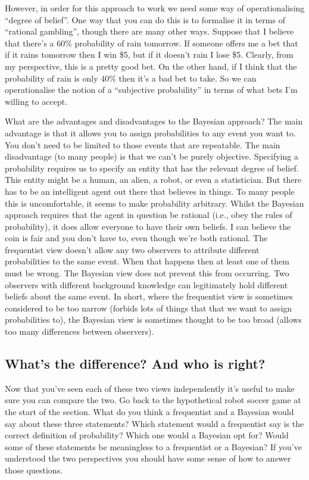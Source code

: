 \documentclass[
  a4paper,
]{book}
\begin{document}
However, in order for this approach to work we need some way of
operationalising ``degree of belief''. One way that you can do this is
to formalise it in terms of ``rational gambling'', though there are many
other ways. Suppose that I believe that there's a 60\% probability of
rain tomorrow. If someone offers me a bet that if it rains tomorrow then
I win \$5, but if it doesn't rain I lose \$5. Clearly, from my
perspective, this is a pretty good bet. On the other hand, if I think
that the probability of rain is only 40\% then it's a bad bet to take.
So we can operationalise the notion of a ``subjective probability'' in
terms of what bets I'm willing to accept.

What are the advantages and disadvantages to the Bayesian approach? The
main advantage is that it allows you to assign probabilities to any
event you want to. You don't need to be limited to those events that are
repeatable. The main disadvantage (to many people) is that we can't be
purely objective. Specifying a probability requires us to specify an
entity that has the relevant degree of belief. This entity might be a
human, an alien, a robot, or even a statistician. But there has to be an
intelligent agent out there that believes in things. To many people this
is uncomfortable, it seems to make probability arbitrary. Whilst the
Bayesian approach requires that the agent in question be rational (i.e.,
obey the rules of probability), it does allow everyone to have their own
beliefs. I can believe the coin is fair and you don't have to, even
though we're both rational. The frequentist view doesn't allow any two
observers to attribute different probabilities to the same event. When
that happens then at least one of them must be wrong. The Bayesian view
does not prevent this from occurring. Two observers with different
background knowledge can legitimately hold different beliefs about the
same event. In short, where the frequentist view is sometimes considered
to be too narrow (forbids lots of things that that we want to assign
probabilities to), the Bayesian view is sometimes thought to be too
broad (allows too many differences between observers).

\hypertarget{whats-the-difference-and-who-is-right}{%
\subsection{What's the difference? And who is
right?}\label{whats-the-difference-and-who-is-right}}

Now that you've seen each of these two views independently it's useful
to make sure you can compare the two. Go back to the hypothetical robot
soccer game at the start of the section. What do you think a frequentist
and a Bayesian would say about these three statements? Which statement
would a frequentist say is the correct definition of probability? Which
one would a Bayesian opt for? Would some of these statements be
meaningless to a frequentist or a Bayesian? If you've understood the two
perspectives you should have some sense of how to answer those
questions.
\end{document}
